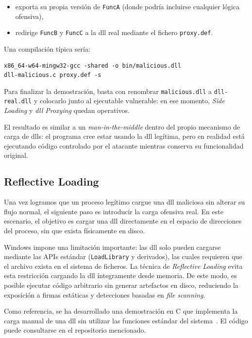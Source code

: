 \begin{itemize}
\item exporta su propia versión de \texttt{FuncA} (donde podría incluirse cualquier lógica ofensiva),
\item redirige \texttt{FuncB} y \texttt{FuncC} a la \acrshort{dll} real mediante el fichero \texttt{proxy.def}.
\end{itemize}

Una compilación típica sería:

\begin{verbatim}
x86_64-w64-mingw32-gcc -shared -o bin/malicious.dll
dll-malicious.c proxy.def -s
\end{verbatim}

Para finalizar la demostración, basta con renombrar \texttt{malicious.dll} a \texttt{dll-real.dll} y colocarlo junto al ejecutable vulnerable: en ese momento, \textit{Side Loading} y \textit{\acrshort{dll} Proxying} quedan operativos.

El resultado es similar a un \textit{man-in-the-middle} dentro del propio mecanismo de carga de \acrshort{dll}s: el programa cree estar usando la \acrshort{dll} legítima, pero en realidad está ejecutando código controlado por el atacante mientras conserva su funcionalidad original.
\subsection{Reflective Loading}

Una vez logramos que un proceso legítimo cargue una \acrshort{dll} maliciosa sin alterar su flujo normal, el siguiente paso es introducir la carga ofensiva real. En este escenario, el objetivo es cargar una \acrshort{dll} directamente en el espacio de direcciones del proceso, sin que exista físicamente en disco.

Windows impone una limitación importante: las \acrshort{dll} solo pueden cargarse mediante las APIs estándar (\texttt{LoadLibrary} y derivados), las cuales requieren que el archivo exista en el sistema de ficheros. La técnica de \textit{Reflective Loading} evita esta restricción cargando la \acrshort{dll} íntegramente desde memoria. De este modo, es posible ejecutar código arbitrario sin generar artefactos en disco, reduciendo la exposición a firmas estáticas y detecciones basadas en \textit{file scanning}.

Como referencia, se ha desarrollado una demostración en C que implementa la carga manual de una \acrshort{dll} sin utilizar las funciones estándar del sistema~\cite{walkingloader}. El código puede consultarse en el repositorio mencionado.

